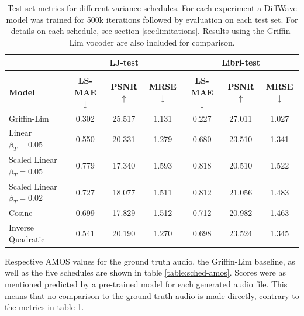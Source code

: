 \documentclass{report}
\begin{document}
\begin{table}[H]
\centering
\def\arraystretch{1.3}
\begin{tabular}{l | c c c | c c c }
\hline
 & \multicolumn{3}{c|}{\textbf{LJ-test}} & \multicolumn{3}{c}{\textbf{Libri-test}} \\
\hline\hline
\vspace{-0.5cm} \\
\textbf{Model} & \textbf{LS-MAE} $\downarrow$ & \textbf{PSNR} $\uparrow$ & \textbf{MRSE} $\downarrow$ & \textbf{LS-MAE} $\downarrow$ & \textbf{PSNR} $\uparrow$ & \textbf{MRSE} $\downarrow$ \\ [0.5ex]
\hline
Griffin-Lim & 0.302 & 25.517 & 1.131 & 0.227 & 27.011 & 1.027 \\
\hline
\hline
Linear $\beta_T=0.05$ & 0.550 & 20.331 & 1.279 & 0.680 & 23.510 & 1.341 \\ 
\hline
Scaled Linear $\beta_T=0.05$ & 0.779 & 17.340 & 1.593 & 0.818 & 20.510 & 1.522 \\
\hline
Scaled Linear $\beta_T=0.02$ & 0.727 & 18.077 & 1.511 & 0.812 & 21.056 & 1.483 \\
\hline
Cosine & 0.699 & 17.829 & 1.512 & 0.712 & 20.982 & 1.463 \\
\hline
Inverse Quadratic & 0.541 & 20.190 & 1.270 & 0.698 & 23.524 & 1.345 \\
\hline\hline
\end{tabular}
\caption{\onehalfspacing Test set metrics for different variance schedules. For each experiment a DiffWave model was trained for 500k iterations followed by evaluation on each test set. For details on each schedule, see section \ref{sec:limitations}. Results using the Griffin-Lim vocoder are also included for comparison.}
\label{table:scheds}
\end{table}


Respective AMOS values for the ground truth audio, the Griffin-Lim baseline, as well as the five schedules are shown in table \ref{table:sched-amos}. Scores were as mentioned predicted by a pre-trained model for each generated audio file. This means that no comparison to the ground truth audio is made directly, contrary to the metrics in table \ref{table:scheds}.
\end{document}
